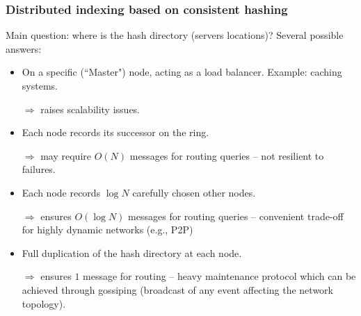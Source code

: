 \documentclass{beamer}
\begin{document}
\begin{frame}
\frametitle{Distributed indexing based on consistent hashing}


Main question: \alert{where is the hash
directory (servers locations)}? Several possible answers:


\begin{itemize}
  \item  \alert{On a specific (``Master") node}, acting as a load
  balancer. Example: caching systems.
  
  $\Rightarrow$ raises scalability issues.
 
  \item \alert{Each node  records its successor on the ring}.
  
    $\Rightarrow$ may require $O(N)$ messages for routing queries -- not
    resilient to failures.
 
  \item  \alert{Each node  records $\log N$ carefully chosen other nodes.}
 
    $\Rightarrow$ ensures $O(\log N)$ messages for routing queries -- convenient
    trade-off for highly dynamic networks (e.g., P2P)

 \item \alert{Full duplication of
  the hash directory at each node.} 
  
   $\Rightarrow$ ensures $1$ message for routing  -- heavy maintenance protocol
   which can be achieved through \alert{gossiping} (broadcast of any event
   affecting the network topology).

\end{itemize}

\end{frame}
\end{document}
